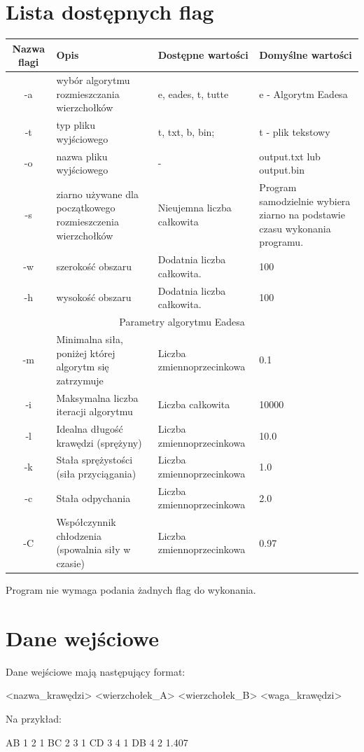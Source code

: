 \documentclass[]{article}
\begin{document}
	\clearpage
	\section{Lista dostępnych flag}
	\begin{tabularx}{\textwidth}{| c | X | X | X |}
		\hline
		Nazwa flagi & Opis & Dostępne wartości & Domyślne wartości\\
		\hline
		-a & wybór algorytmu rozmieszczania wierzchołków & e, eades, t, tutte & e - Algorytm Eadesa\\
		\hline
		-t & typ pliku wyjściowego & t, txt, b, bin; & t - plik tekstowy\\
		\hline
		-o & nazwa pliku wyjściowego & - & output.txt lub output.bin\\
		\hline
		-s & ziarno używane dla początkowego rozmieszczenia wierzchołków & Nieujemna liczba całkowita &
		Program samodzielnie wybiera ziarno na podstawie czasu wykonania programu. \\
		\hline
		-w & szerokość obszaru & Dodatnia liczba całkowita. & 100 \\
		\hline
		-h & wysokość obszaru & Dodatnia liczba całkowita. & 100 \\
		\hline
		\multicolumn{4}{|c|}{Parametry algorytmu Eadesa} \\
		\hline
		-m & Minimalna siła, poniżej której algorytm się zatrzymuje & Liczba zmiennoprzecinkowa & 0.1 \\
		\hline
		-i & Maksymalna liczba iteracji algorytmu & Liczba całkowita & 10000 \\
		\hline
		-l & Idealna długość krawędzi (sprężyny) & Liczba zmiennoprzecinkowa & 10.0 \\
		\hline
		-k & Stała sprężystości (siła przyciągania) & Liczba zmiennoprzecinkowa & 1.0 \\
		\hline
		-c & Stała odpychania & Liczba zmiennoprzecinkowa & 2.0 \\
		\hline
		-C & Współczynnik chłodzenia (spowalnia siły w czasie) & Liczba zmiennoprzecinkowa & 0.97 \\
		\hline
	\end{tabularx}

	Program nie wymaga podania żadnych flag do wykonania.
	\section{Dane wejściowe}
	Dane wejściowe mają następujący format:
	\begin{mylisting}
<nazwa_krawędzi> <wierzchołek_A> <wierzchołek_B> <waga_krawędzi>	
	\end{mylisting}
	Na przykład:
	\begin{mylisting}
AB   1  2  1
BC   2  3  1
CD   3  4  1
DB   4  2  1.407
	\end{mylisting}
\end{document}
